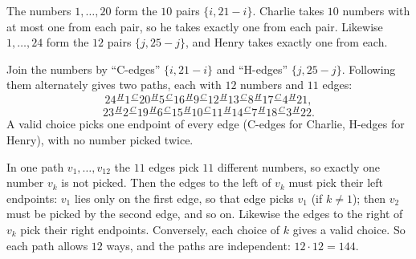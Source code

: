 The numbers $1,\dots,20$ form the $10$ pairs $\{i,21-i\}$. Charlie takes $10$ numbers with at most one from each pair, so he takes exactly one from each pair. Likewise $1,\dots,24$ form the $12$ pairs $\{j,25-j\}$, and Henry takes exactly one from each.

Join the numbers by ``C-edges'' $\{i,21-i\}$ and ``H-edges'' $\{j,25-j\}$. Following them alternately gives two paths, each with $12$ numbers and $11$ edges:
\[24\overset{H}{-}1\overset{C}{-}20\overset{H}{-}5\overset{C}{-}16\overset{H}{-}9\overset{C}{-}12\overset{H}{-}13\overset{C}{-}8\overset{H}{-}17\overset{C}{-}4\overset{H}{-}21,\]
\[23\overset{H}{-}2\overset{C}{-}19\overset{H}{-}6\overset{C}{-}15\overset{H}{-}10\overset{C}{-}11\overset{H}{-}14\overset{C}{-}7\overset{H}{-}18\overset{C}{-}3\overset{H}{-}22.\]
A valid choice picks one endpoint of every edge (C-edges for Charlie, H-edges for Henry), with no number picked twice.

In one path $v_1,\dots,v_{12}$ the $11$ edges pick $11$ different numbers, so exactly one number $v_k$ is not picked. Then the edges to the left of $v_k$ must pick their left endpoints: $v_1$ lies only on the first edge, so that edge picks $v_1$ (if $k\ne1$); then $v_2$ must be picked by the second edge, and so on. Likewise the edges to the right of $v_k$ pick their right endpoints. Conversely, each choice of $k$ gives a valid choice. So each path allows $12$ ways, and the paths are independent: $12\cdot12=\boxed{144}$.
